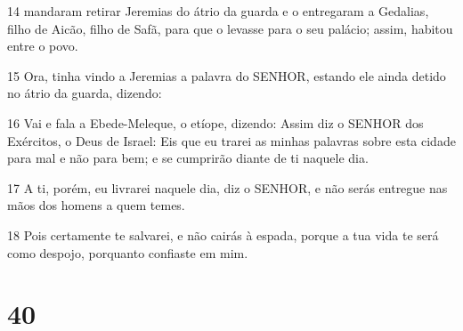 \par 14 mandaram retirar Jeremias do átrio da guarda e o entregaram a Gedalias, filho de Aicão, filho de Safã, para que o levasse para o seu palácio; assim, habitou entre o povo.
\par 15 Ora, tinha vindo a Jeremias a palavra do SENHOR, estando ele ainda detido no átrio da guarda, dizendo:
\par 16 Vai e fala a Ebede-Meleque, o etíope, dizendo: Assim diz o SENHOR dos Exércitos, o Deus de Israel: Eis que eu trarei as minhas palavras sobre esta cidade para mal e não para bem; e se cumprirão diante de ti naquele dia.
\par 17 A ti, porém, eu livrarei naquele dia, diz o SENHOR, e não serás entregue nas mãos dos homens a quem temes.
\par 18 Pois certamente te salvarei, e não cairás à espada, porque a tua vida te será como despojo, porquanto confiaste em mim.

\chapter{40}

